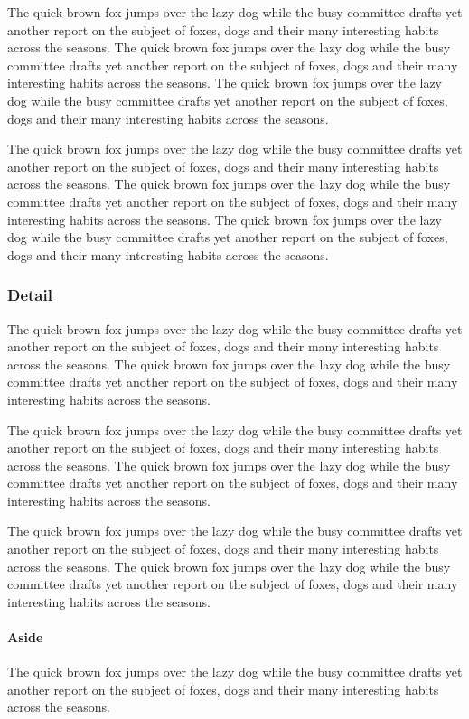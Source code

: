 \documentclass{article}
\begin{document}
The quick brown fox jumps over the lazy dog while the busy committee drafts yet another report on the subject of foxes, dogs and their many interesting habits across the seasons. The quick brown fox jumps over the lazy dog while the busy committee drafts yet another report on the subject of foxes, dogs and their many interesting habits across the seasons. The quick brown fox jumps over the lazy dog while the busy committee drafts yet another report on the subject of foxes, dogs and their many interesting habits across the seasons. 

The quick brown fox jumps over the lazy dog while the busy committee drafts yet another report on the subject of foxes, dogs and their many interesting habits across the seasons. The quick brown fox jumps over the lazy dog while the busy committee drafts yet another report on the subject of foxes, dogs and their many interesting habits across the seasons. The quick brown fox jumps over the lazy dog while the busy committee drafts yet another report on the subject of foxes, dogs and their many interesting habits across the seasons. 

\subsubsection{Detail}
The quick brown fox jumps over the lazy dog while the busy committee drafts yet another report on the subject of foxes, dogs and their many interesting habits across the seasons. The quick brown fox jumps over the lazy dog while the busy committee drafts yet another report on the subject of foxes, dogs and their many interesting habits across the seasons. 

The quick brown fox jumps over the lazy dog while the busy committee drafts yet another report on the subject of foxes, dogs and their many interesting habits across the seasons. The quick brown fox jumps over the lazy dog while the busy committee drafts yet another report on the subject of foxes, dogs and their many interesting habits across the seasons. 

The quick brown fox jumps over the lazy dog while the busy committee drafts yet another report on the subject of foxes, dogs and their many interesting habits across the seasons. The quick brown fox jumps over the lazy dog while the busy committee drafts yet another report on the subject of foxes, dogs and their many interesting habits across the seasons. 

\paragraph{Aside} The quick brown fox jumps over the lazy dog while the busy committee drafts yet another report on the subject of foxes, dogs and their many interesting habits across the seasons. 
\end{document}
